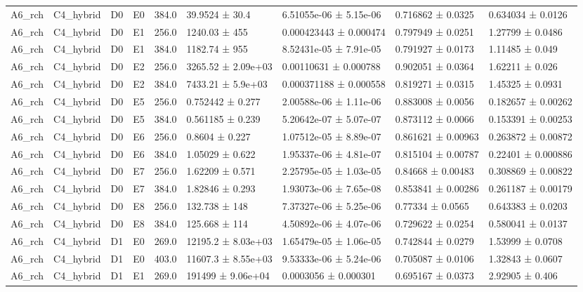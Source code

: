 \begin{table}
\begin{tabular}{lllllllll}
A6\_rch & C4\_hybrid & D0 & E0 & 384.0 & 39.9524 ± 30.4 & 6.51055e-06 ± 5.15e-06 & 0.716862 ± 0.0325 & 0.634034 ± 0.0126 \\
A6\_rch & C4\_hybrid & D0 & E1 & 256.0 & 1240.03 ± 455 & 0.000423443 ± 0.000474 & 0.797949 ± 0.0251 & 1.27799 ± 0.0486 \\
A6\_rch & C4\_hybrid & D0 & E1 & 384.0 & 1182.74 ± 955 & 8.52431e-05 ± 7.91e-05 & 0.791927 ± 0.0173 & 1.11485 ± 0.049 \\
A6\_rch & C4\_hybrid & D0 & E2 & 256.0 & 3265.52 ± 2.09e+03 & 0.00110631 ± 0.000788 & 0.902051 ± 0.0364 & 1.62211 ± 0.026 \\
A6\_rch & C4\_hybrid & D0 & E2 & 384.0 & 7433.21 ± 5.9e+03 & 0.000371188 ± 0.000558 & 0.819271 ± 0.0315 & 1.45325 ± 0.0931 \\
A6\_rch & C4\_hybrid & D0 & E5 & 256.0 & 0.752442 ± 0.277 & 2.00588e-06 ± 1.11e-06 & 0.883008 ± 0.0056 & 0.182657 ± 0.00262 \\
A6\_rch & C4\_hybrid & D0 & E5 & 384.0 & 0.561185 ± 0.239 & 5.20642e-07 ± 5.07e-07 & 0.873112 ± 0.0066 & 0.153391 ± 0.00253 \\
A6\_rch & C4\_hybrid & D0 & E6 & 256.0 & 0.8604 ± 0.227 & 1.07512e-05 ± 8.89e-07 & 0.861621 ± 0.00963 & 0.263872 ± 0.00872 \\
A6\_rch & C4\_hybrid & D0 & E6 & 384.0 & 1.05029 ± 0.622 & 1.95337e-06 ± 4.81e-07 & 0.815104 ± 0.00787 & 0.22401 ± 0.000886 \\
A6\_rch & C4\_hybrid & D0 & E7 & 256.0 & 1.62209 ± 0.571 & 2.25795e-05 ± 1.03e-05 & 0.84668 ± 0.00483 & 0.308869 ± 0.00822 \\
A6\_rch & C4\_hybrid & D0 & E7 & 384.0 & 1.82846 ± 0.293 & 1.93073e-06 ± 7.65e-08 & 0.853841 ± 0.00286 & 0.261187 ± 0.00179 \\
A6\_rch & C4\_hybrid & D0 & E8 & 256.0 & 132.738 ± 148 & 7.37327e-06 ± 5.25e-06 & 0.77334 ± 0.0565 & 0.643383 ± 0.0203 \\
A6\_rch & C4\_hybrid & D0 & E8 & 384.0 & 125.668 ± 114 & 4.50892e-06 ± 4.07e-06 & 0.729622 ± 0.0254 & 0.580041 ± 0.0137 \\
A6\_rch & C4\_hybrid & D1 & E0 & 269.0 & 12195.2 ± 8.03e+03 & 1.65479e-05 ± 1.06e-05 & 0.742844 ± 0.0279 & 1.53999 ± 0.0708 \\
A6\_rch & C4\_hybrid & D1 & E0 & 403.0 & 11607.3 ± 8.55e+03 & 9.53333e-06 ± 5.24e-06 & 0.705087 ± 0.0106 & 1.32843 ± 0.0607 \\
A6\_rch & C4\_hybrid & D1 & E1 & 269.0 & 191499 ± 9.06e+04 & 0.0003056 ± 0.000301 & 0.695167 ± 0.0373 & 2.92905 ± 0.406 \\

\end{tabular}
\end{table}
